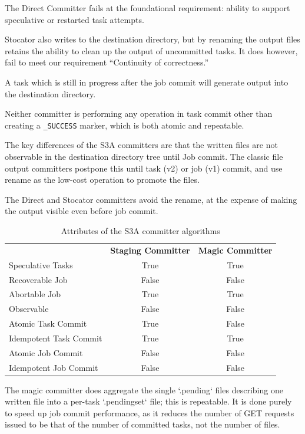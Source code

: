 \documentclass[conference]{IEEEtran}
\begin{document}
The Direct Committer fails at the foundational requirement: ability to support
speculative or restarted task attempts.

Stocator also writes to the destination directory, but by renaming the output
files retains the ability to clean up the output of uncommitted tasks.
It does however, fail to meet our requirement ``Continuity of correctness.''

A task which is still in progress after the job commit will generate output
into the destination directory.


Neither committer is performing any operation in task commit other than creating
a \texttt{\_SUCCESS} marker, which is both atomic and repeatable.


The key differences of the S3A committers are that the written files are
not observable in the destination directory tree until Job commit.
The classic file output committers postpone this until task (v2) or job (v1)
commit, and use rename as the low-cost operation to promote the files.


The Direct and Stocator committers avoid the rename, at the expense of making
the output visible even before job commit.

\begin{table}
  \label{tab:s3a-committer-attributes}
  \begin{tabular}{ l c c }
    \hline
    & \textbf{Staging Committer} & \textbf{Magic Committer} \\
    Speculative Tasks & True & True \\
    Recoverable Job & False & False \\
    Abortable Job & True & True \\
    Observable & False & False \\
    Atomic Task Commit & True & False \\
    Idempotent Task Commit & True & True \\
    Atomic Job Commit & False & False \\
    Idempotent Job Commit & False & False \\
    \hline
  \end{tabular}
  \caption{Attributes of the S3A committer algorithms}
\end{table}


The magic committer does aggregate the single `.pending` files describing
one written file into a per-task `.pendingset` file;
this is repeatable.
It is done purely to speed up job commit performance, as it reduces the
number of GET requests issued to be that of the number of committed tasks,
not the number of files.
\end{document}
